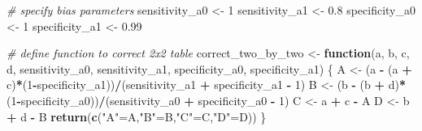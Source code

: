 \documentclass[
]{book}
\newenvironment{Shaded}{\begin{snugshade}}{\end{snugshade}}
\newcommand{\CommentTok}[1]{\textcolor[rgb]{0.56,0.35,0.01}{\textit{#1}}}
\newcommand{\ControlFlowTok}[1]{\textcolor[rgb]{0.13,0.29,0.53}{\textbf{#1}}}
\newcommand{\DecValTok}[1]{\textcolor[rgb]{0.00,0.00,0.81}{#1}}
\newcommand{\FloatTok}[1]{\textcolor[rgb]{0.00,0.00,0.81}{#1}}
\newcommand{\FunctionTok}[1]{\textcolor[rgb]{0.13,0.29,0.53}{\textbf{#1}}}
\newcommand{\NormalTok}[1]{#1}
\newcommand{\OtherTok}[1]{\textcolor[rgb]{0.56,0.35,0.01}{#1}}
\newcommand{\SpecialCharTok}[1]{\textcolor[rgb]{0.81,0.36,0.00}{\textbf{#1}}}
\newcommand{\StringTok}[1]{\textcolor[rgb]{0.31,0.60,0.02}{#1}}
\begin{document}
\begin{Shaded}
\begin{Highlighting}[]
\CommentTok{\# specify bias parameters}
\NormalTok{sensitivity\_a0 }\OtherTok{\textless{}{-}}  \DecValTok{1}
\NormalTok{sensitivity\_a1 }\OtherTok{\textless{}{-}} \FloatTok{0.8}
\NormalTok{specificity\_a0 }\OtherTok{\textless{}{-}} \DecValTok{1}
\NormalTok{specificity\_a1 }\OtherTok{\textless{}{-}} \FloatTok{0.99}

\CommentTok{\# define function to correct 2x2 table}
\NormalTok{correct\_two\_by\_two }\OtherTok{\textless{}{-}} \ControlFlowTok{function}\NormalTok{(a, b, c, d, sensitivity\_a0, sensitivity\_a1, specificity\_a0, specificity\_a1) \{}
\NormalTok{  A }\OtherTok{\textless{}{-}}\NormalTok{ (a }\SpecialCharTok{{-}}\NormalTok{ (a }\SpecialCharTok{+}\NormalTok{ c)}\SpecialCharTok{*}\NormalTok{(}\DecValTok{1}\SpecialCharTok{{-}}\NormalTok{specificity\_a1))}\SpecialCharTok{/}\NormalTok{(sensitivity\_a1 }\SpecialCharTok{+}\NormalTok{ specificity\_a1 }\SpecialCharTok{{-}} \DecValTok{1}\NormalTok{)}
\NormalTok{  B }\OtherTok{\textless{}{-}}\NormalTok{ (b }\SpecialCharTok{{-}}\NormalTok{ (b }\SpecialCharTok{+}\NormalTok{ d)}\SpecialCharTok{*}\NormalTok{(}\DecValTok{1}\SpecialCharTok{{-}}\NormalTok{specificity\_a0))}\SpecialCharTok{/}\NormalTok{(sensitivity\_a0 }\SpecialCharTok{+}\NormalTok{ specificity\_a0 }\SpecialCharTok{{-}} \DecValTok{1}\NormalTok{)}
\NormalTok{  C }\OtherTok{\textless{}{-}}\NormalTok{ a }\SpecialCharTok{+}\NormalTok{ c }\SpecialCharTok{{-}}\NormalTok{ A}
\NormalTok{  D }\OtherTok{\textless{}{-}}\NormalTok{ b }\SpecialCharTok{+}\NormalTok{ d }\SpecialCharTok{{-}}\NormalTok{ B}
  \FunctionTok{return}\NormalTok{(}\FunctionTok{c}\NormalTok{(}\StringTok{"A"}\OtherTok{=}\NormalTok{A,}\StringTok{"B"}\OtherTok{=}\NormalTok{B,}\StringTok{"C"}\OtherTok{=}\NormalTok{C,}\StringTok{"D"}\OtherTok{=}\NormalTok{D))}
\NormalTok{\}}


\end{Highlighting}
\end{Shaded}
\end{document}
